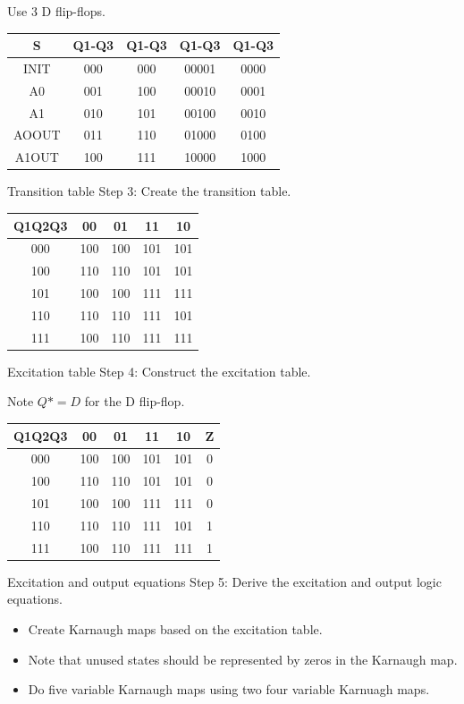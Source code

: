 Use 3 D flip-flops. \\

\begin{tabular}{c|cccc}
  S & Q1-Q3 & Q1-Q3 & Q1-Q3 & Q1-Q3 \\
  \hline
  INIT  & 000 & 000 & 00001 & 0000 \\
  A0    & 001 & 100 & 00010 & 0001 \\
  A1    & 010 & 101 & 00100 & 0010 \\
  AOOUT & 011 & 110 & 01000 & 0100 \\
  A1OUT & 100 & 111 & 10000 & 1000 \\
\end{tabular}

\begin{frame}{Transition table}
  Step 3: Create the transition table.
\end{frame}

\begin{tabular}{c|cccc}
  Q1Q2Q3 & 00 & 01 & 11 & 10 \\
  \hline
  000 & 100 & 100 & 101 & 101 \\
  100 & 110 & 110 & 101 & 101 \\
  101 & 100 & 100 & 111 & 111 \\
  110 & 110 & 110 & 111 & 101 \\
  111 & 100 & 110 & 111 & 111 \\
\end{tabular}

\begin{frame}{Excitation table}
  Step 4: Construct the excitation table.
\end{frame}

Note $Q*=D$ for the D flip-flop.

\begin{tabular}{c|cccc|c}
  Q1Q2Q3 & 00 & 01 & 11 & 10 & Z\\
  \hline
  000 & 100 & 100 & 101 & 101 & 0\\
  100 & 110 & 110 & 101 & 101 & 0\\
  101 & 100 & 100 & 111 & 111 & 0\\
  110 & 110 & 110 & 111 & 101 & 1\\
  111 & 100 & 110 & 111 & 111 & 1\\
\end{tabular}

\begin{frame}{Excitation and output equations}
  Step 5: Derive the excitation and output logic equations.
  \begin{itemize}
    \item Create Karnaugh maps based on the excitation table.
    \item Note that unused states should be represented by zeros in the Karnaugh map.
    \item Do five variable Karnaugh maps using two four variable Karnuagh maps.
  \end{itemize}
\end{frame}

